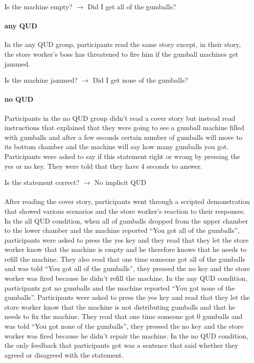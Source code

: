 \documentclass[12pt]{article}
\begin{document}
\begin{center}Is the machine empty? $\rightarrow$ Did I get all of the gumballs?\end{center}

\paragraph{any QUD} In the any QUD group, participants read the same story except, in their story, the store worker’s boss has threatened to fire him if the gumball machines get jammed. 

\begin{center}Is the machine jammed? $\rightarrow$ Did I get none of the gumballs?\end{center}

\paragraph{no QUD} Participants in the no QUD group didn’t read a cover story but instead read instructions that explained that they were going to see a gumball machine filled with gumballs and after a few seconds certain number of gumballs will move to its bottom chamber and the machine will say how many gumballs you got. Participants were asked to say if this statement right or wrong by pressing the yes or no key. They were told that they have 4 seconds to answer.

\begin{center}Is the statement correct? $\rightarrow$ No implicit QUD\end{center}

\paragraph{}After reading the cover story, participants went through a scripted demonstration that showed various scenarios and the store worker’s reaction to their responses. In the all QUD condition, when all of gumballs dropped from the upper chamber to the lower chamber and the machine reported “You got all of the gumballs”, participants were asked to press the yes key and they read that they let the store worker know that the machine is empty and he therefore knows that he needs to refill the machine. They also read that one time someone got all of the gumballs and was told “You got all of the gumballs”, they pressed the no key and the store worker was fired because he didn’t refill the machine. In the any QUD condition, participants got no gumballs and the machine reported “You got none of the gumballs”. Participants were asked to press the yes key and read that they let the store worker know that the machine is not distributing gumballs and that he needs to fix the machine. They read that one time someone got 0 gumballs and was told “You got none of the gumballs”, they pressed the no key and the store worker was fired because he didn’t repair the machine. In the no QUD condition, the only feedback that participants got was a sentence that said whether they agreed or disagreed with the statement.
\end{document}
